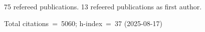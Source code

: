 75 refereed publications. 13 refeered publications as first author.

Total citations~=~5060; h-index~=~37 (2025-08-17)